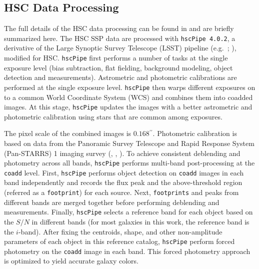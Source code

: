 \documentclass[a4paper,fleqn,usenatbib]{mnras}
\def\asec{$^{\prime\prime}$}
\begin{document}
\subsection{HSC Data Processing}
    \label{sec:pipeline}

    The full details of the HSC data processing can be found in \citet{Bosch2017}
    and are briefly summarized here. 
    The HSC SSP data are processed with \texttt{hscPipe 4.0.2}, a derivative of the 
    Large Synoptic Survey Telescope (LSST) pipeline (e.g.\ \citealt{Juric2015}; 
    \citealt{Axelrod2010}), modified for HSC. 
    \texttt{hscPipe} first performs a number of tasks at the single exposure level 
    (bias subtraction, flat fielding, background modeling, object detection and 
    measurements). 
    Astrometric and photometric calibrations are performed at the single exposure 
    level. 
    \texttt{hscPipe} then warps different exposures on to a common World Coordinate 
    System (WCS) and combines them into coadded images. 
    At this stage, \texttt{hscPipe} updates the images with a better astrometric and 
    photometric calibration using stars that are common among exposures. 
    
    The pixel scale of the combined images is $0.168$\asec{}. 
    Photometric calibration is based on data from the Panoramic Survey Telescope 
    and Rapid Response System (Pan-STARRS) 1 imaging survey 
    (\citealt{Schlafly2012}, \citealt{Tonry2012}, \citealt{Magnier2013}). 
    To achieve consistent deblending and photometry across all bands, \texttt{hscPipe} 
    performs multi-band post-processing at the \texttt{coadd} level. 
    First, \texttt{hscPipe} performs object detection on \texttt{coadd} images in 
    each band independently and records the flux peak and the above-threshold region 
    (referred as a \texttt{footprint}) for each source. 
    Next, \texttt{footprints} and peaks from different bands are merged together before     
    performing deblending and measurements. 
    Finally, \texttt{hscPipe} selects a reference band for each object based on the 
    $S/N$ in different bands (for most galaxies in this work, the reference band is 
    the $i$-band). 
    After fixing the centroids, shape, and other non-amplitude parameters of each 
    object in this reference catalog, \texttt{hscPipe} perform forced photometry 
    on the \texttt{coadd} image in each band. 
    This forced photometry approach is optimized to yield accurate galaxy colors. 
       
\end{document}
